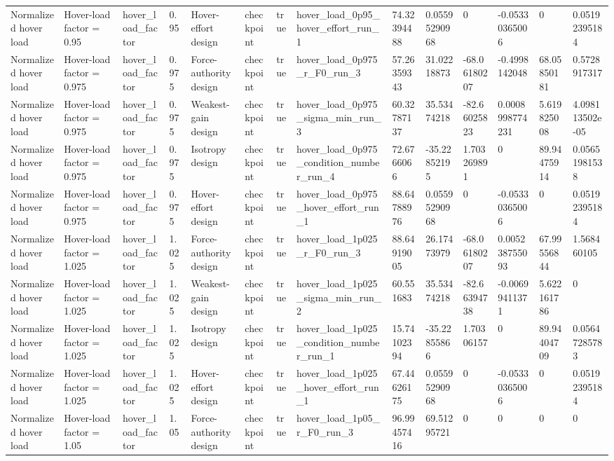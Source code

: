 \begin{tabular}{@{}llllllllllllll@{}}
Normalized hover load & Hover-load factor = 0.95 & hover\_load\_factor & 0.95 & Hover-effort design & checkpoint & true & hover\_load\_0p95\_hover\_effort\_run\_1 & 74.32394488 & 0.05595290968 & 0 & -0.05330365006 & 0 & 0.05192395184 \\
Normalized hover load & Hover-load factor = 0.975 & hover\_load\_factor & 0.975 & Force-authority design & checkpoint & true & hover\_load\_0p975\_r\_F0\_run\_3 & 57.26359343 & 31.02218873 & -68.06180207 & -0.4998142048 & 68.05850181 & 0.5728917317 \\
Normalized hover load & Hover-load factor = 0.975 & hover\_load\_factor & 0.975 & Weakest-gain design & checkpoint & true & hover\_load\_0p975\_sigma\_min\_run\_3 & 60.32787137 & 35.53474218 & -82.66025823 & 0.0008998774231 & 5.619825008 & 4.098113502e-05 \\
Normalized hover load & Hover-load factor = 0.975 & hover\_load\_factor & 0.975 & Isotropy design & checkpoint & true & hover\_load\_0p975\_condition\_number\_run\_4 & 72.6766066 & -35.22852195 & 1.703269891 & 0 & 89.94475914 & 0.05651981538 \\
Normalized hover load & Hover-load factor = 0.975 & hover\_load\_factor & 0.975 & Hover-effort design & checkpoint & true & hover\_load\_0p975\_hover\_effort\_run\_1 & 88.64788976 & 0.05595290968 & 0 & -0.05330365006 & 0 & 0.05192395184 \\
Normalized hover load & Hover-load factor = 1.025 & hover\_load\_factor & 1.025 & Force-authority design & checkpoint & true & hover\_load\_1p025\_r\_F0\_run\_3 & 88.64919005 & 26.17473979 & -68.06180207 & 0.005238755093 & 67.99556844 & 1.568460105 \\
Normalized hover load & Hover-load factor = 1.025 & hover\_load\_factor & 1.025 & Weakest-gain design & checkpoint & true & hover\_load\_1p025\_sigma\_min\_run\_2 & 60.551683 & 35.53474218 & -82.66394738 & -0.00699411371 & 5.622161786 & 0 \\
Normalized hover load & Hover-load factor = 1.025 & hover\_load\_factor & 1.025 & Isotropy design & checkpoint & true & hover\_load\_1p025\_condition\_number\_run\_1 & 15.74102394 & -35.22855866 & 1.70306157 & 0 & 89.94404709 & 0.05647285783 \\
Normalized hover load & Hover-load factor = 1.025 & hover\_load\_factor & 1.025 & Hover-effort design & checkpoint & true & hover\_load\_1p025\_hover\_effort\_run\_1 & 67.44626175 & 0.05595290968 & 0 & -0.05330365006 & 0 & 0.05192395184 \\
Normalized hover load & Hover-load factor = 1.05 & hover\_load\_factor & 1.05 & Force-authority design & checkpoint & true & hover\_load\_1p05\_r\_F0\_run\_3 & 96.99457416 & 69.51295721 & 0 & 0 & 0 & 0 \\

\end{tabular}
